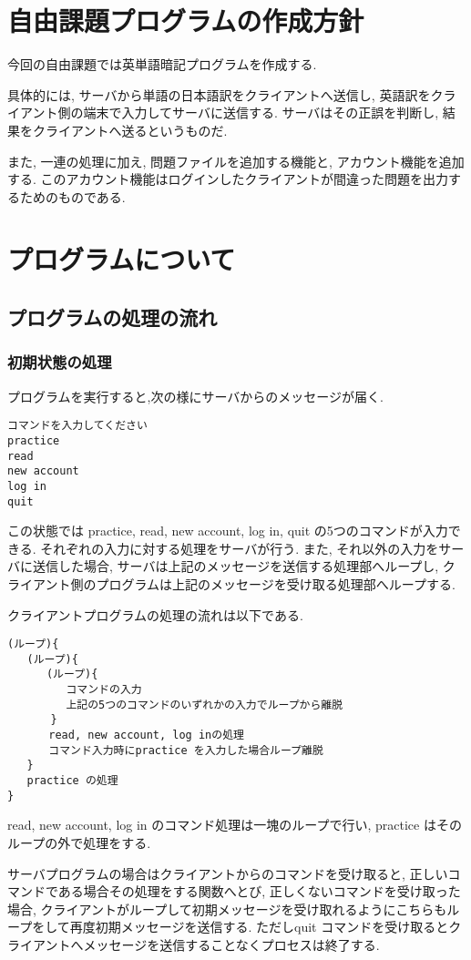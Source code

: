 \documentclass[a4j]{jarticle}
\begin{document}
\section{自由課題プログラムの作成方針}
今回の自由課題では英単語暗記プログラムを作成する.

具体的には, サーバから単語の日本語訳をクライアントへ送信し, 英語訳をクライアント側の端末で入力してサーバに送信する. サーバはその正誤を判断し, 結果をクライアントへ送るというものだ. 

また, 一連の処理に加え, 問題ファイルを追加する機能と, アカウント機能を追加する. 
このアカウント機能はログインしたクライアントが間違った問題を出力するためのものである.


\section{プログラムについて}
\subsection{プログラムの処理の流れ}
\subsubsection{初期状態の処理}
プログラムを実行すると,次の様にサーバからのメッセージが届く.
\begin{verbatim}
コマンドを入力してください
practice
read
new account
log in
quit
\end{verbatim}
この状態では practice, read, new account, log in, quit の5つのコマンドが入力できる.
それぞれの入力に対する処理をサーバが行う.
また, それ以外の入力をサーバに送信した場合, サーバは上記のメッセージを送信する処理部へループし, クライアント側のプログラムは上記のメッセージを受け取る処理部へループする.

クライアントプログラムの処理の流れは以下である.
\begin{verbatim}
(ループ){
   (ループ){
      (ループ){
         コマンドの入力
         上記の5つのコマンドのいずれかの入力でループから離脱
　　　　}
   　　read, new account, log inの処理
   　　コマンド入力時にpractice を入力した場合ループ離脱
   }
   practice の処理
}
\end{verbatim}
read, new account, log in のコマンド処理は一塊のループで行い, practice はそのループの外で処理をする.

サーバプログラムの場合はクライアントからのコマンドを受け取ると, 正しいコマンドである場合その処理をする関数へとび, 正しくないコマンドを受け取った場合, クライアントがループして初期メッセージを受け取れるようにこちらもループをして再度初期メッセージを送信する. ただしquit コマンドを受け取るとクライアントへメッセージを送信することなくプロセスは終了する.
\end{document}
